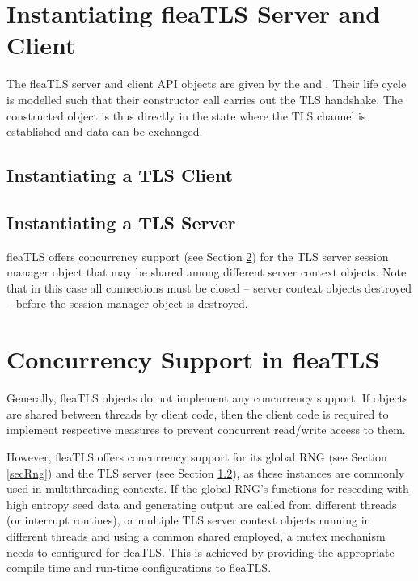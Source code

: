 \documentclass[a4paper,11pt]{scrartcl}
\begin{document}
\section{Instantiating fleaTLS Server and Client}

The fleaTLS server and client API objects are given by the
\serverCtx and \clientCtx. Their life cycle is modelled such that their
constructor call carries out the TLS handshake. The constructed object is thus
directly in the state where the TLS channel is established and data can be
exchanged.

\subsection{Instantiating a TLS Client}

\subsection{Instantiating a TLS Server}
\label{secTlsServer}
fleaTLS offers concurrency support (see Section \ref{secConcurrency}) for the TLS server session manager object
that may be shared among different server context objects. Note that in this
case all connections must be closed -- \ie server context objects destroyed -- before the session manager object is destroyed.


\section{Concurrency Support in fleaTLS}

\label{secConcurrency}
Generally, fleaTLS objects do not implement any concurrency support. If  
objects are shared between threads by client code, then the client code is
required to implement respective measures to prevent concurrent read/write
access to them.

However, fleaTLS offers concurrency support for its global RNG (see Section \ref{secRng})
and the TLS server (see Section \ref{secTlsServer}), as these instances are
commonly used in multithreading contexts. If the global RNG's
functions for reseeding with high entropy seed data and generating output are
called from different threads (or interrupt routines), or multiple TLS
server context objects running in different threads and using a common shared
 employed, a mutex mechanism needs
to configured for fleaTLS. This is achieved by providing the appropriate compile
time and run-time configurations to fleaTLS.
\end{document}
